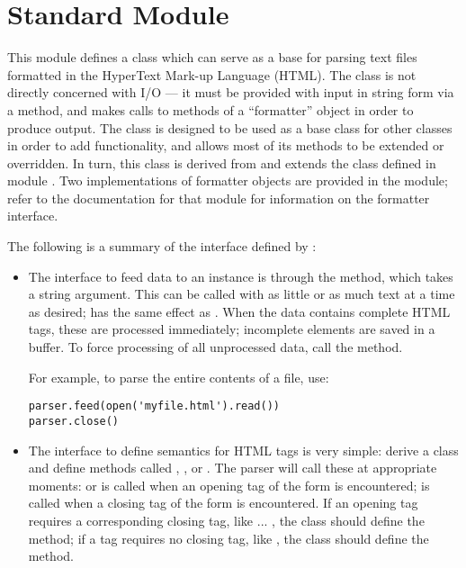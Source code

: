 \section{Standard Module }
\label{module-htmllib}

\renewcommand{\indexsubitem}{(in module htmllib)}

This module defines a class which can serve as a base for parsing text
files formatted in the HyperText Mark-up Language (HTML).  The class
is not directly concerned with I/O --- it must be provided with input
in string form via a method, and makes calls to methods of a
``formatter'' object in order to produce output.  The
 class is designed to be used as a base class for
other classes in order to add functionality, and allows most of its
methods to be extended or overridden.  In turn, this class is derived
from and extends the  class defined in module
.  Two implementations of formatter objects are
provided in the  module; refer to the documentation
for that module for information on the formatter interface.

The following is a summary of the interface defined by
:

\begin{itemize}

\item
The interface to feed data to an instance is through the 
method, which takes a string argument.  This can be called with as
little or as much text at a time as desired;  has the same effect as .  When the data
contains complete HTML tags, these are processed immediately;
incomplete elements are saved in a buffer.  To force processing of all
unprocessed data, call the  method.

For example, to parse the entire contents of a file, use:
\bcode\begin{verbatim}
parser.feed(open('myfile.html').read())
parser.close()
\end{verbatim}\ecode
%
\item
The interface to define semantics for HTML tags is very simple: derive
a class and define methods called ,
, or .  The parser will
call these at appropriate moments:  or
 is called when an opening tag of the form
 is encountered;  is called
when a closing tag of the form  is encountered.  If
an opening tag requires a corresponding closing tag, like 
... , the class should define the 
method; if a tag requires no closing tag, like , the class
should define the  method.

\end{itemize}

